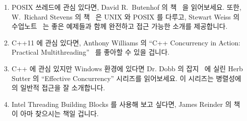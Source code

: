 \begin{enumerate}
\iffalse
\item	If your primary focus is scientific and technical computing,
	and you are interested in GPUs, CUDA, and MPI, you
	might check out Norm Matloff's ``Programming on
	Parallel Machines''~\cite{NormMatloff2013ParProcBook}.
	Of course, the GPU vendors have quite a bit of additional
	information~\cite{AMD2017OpenCL,NVidia2017GPGPU,NVidia2017GPGPU-university}.
\fi
\item	POSIX 쓰레드에 관심 있다면, David R.~Butenhof 의
	책~\cite{Butenhof1997pthreads} 을 읽어보세요.  또한, W.~Richard Stevens
	의 책~\cite{WRichardStevens1992} 은 UNIX 와 POSIX 를 다루고, Stewart
	Weiss 의 수업노트~\cite{StewartWeiss2013UNIX} 는 좋은 예제들과 함께
	완전하고 접근 가능한 소개를 제공합니다.
\iffalse

\item	If you are interested in POSIX Threads, you might take
	a look at David R.~Butenhof's book~\cite{Butenhof1997pthreads}.
	In addition,
	W.~Richard Stevens's book~\cite{WRichardStevens1992}
	covers UNIX and POSIX, and Stewart Weiss's lecture
	notes~\cite{StewartWeiss2013UNIX} provide an
	thorough and accessible introduction with a good set of
	examples.
\fi

\item	C++11 에 관심 있다면, Anthony Williams 의 ``C++ Concurrency in Action:
	Practical Multithreading''~\cite{AnthonyWilliams2012} 를 좋아할 수 있을
	겁니다.

\iffalse
\item	If you are interested in C++11, you might like
	Anthony Williams's ``C++ Concurrency in Action: Practical
	Multithreading''~\cite{AnthonyWilliams2012}.
\fi

\item	C++ 에 관심 있지만 Windows 환경에 있다면 Dr. Dobb 의
	잡지~\cite{HerbSutter2008EffectiveConcurrency} 에 실린 Herb Sutter 의
	``Effective Concurrency'' 시리즈를 읽어보세요.
	이 시리즈는 병렬성에의 일반적 접근을 잘 소개합니다.

\iffalse
\item	If you are interested in C++, but in a Windows environment,
	you might try Herb Sutter's ``Effective Concurrency''
	series in
	Dr. Dobbs Journal~\cite{HerbSutter2008EffectiveConcurrency}.
	This series does a reasonable job of presenting a
	commonsense approach to parallelism.
\fi

\item	Intel Threading Building Blocks 를 사용해 보고 싶다면, James Reinder 의
	책~\cite{Reinders2007Textbook} 이 아마 찾으시는 책일 겁니다.


\end{enumerate}
